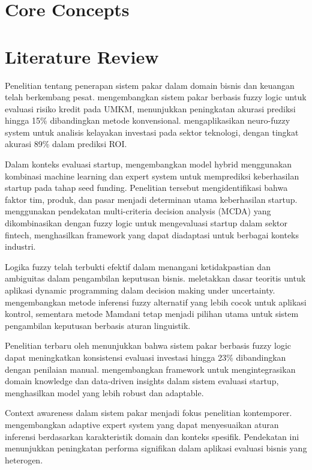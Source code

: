 \documentclass{article}
\begin{document}
\section{Core Concepts}

\section{Literature Review}

Penelitian tentang penerapan sistem pakar dalam domain bisnis dan keuangan telah berkembang pesat. \citet{Kumar2023} mengembangkan sistem pakar berbasis fuzzy logic untuk evaluasi risiko kredit pada UMKM, menunjukkan peningkatan akurasi prediksi hingga 15\% dibandingkan metode konvensional. \citet{Zhang2022} mengaplikasikan neuro-fuzzy system untuk analisis kelayakan investasi pada sektor teknologi, dengan tingkat akurasi 89\% dalam prediksi ROI.

Dalam konteks evaluasi startup, \citet{Silva2023} mengembangkan model hybrid menggunakan kombinasi machine learning dan expert system untuk memprediksi keberhasilan startup pada tahap seed funding. Penelitian tersebut mengidentifikasi bahwa faktor tim, produk, dan pasar menjadi determinan utama keberhasilan startup. \citet{Anderson2022} menggunakan pendekatan multi-criteria decision analysis (MCDA) yang dikombinasikan dengan fuzzy logic untuk mengevaluasi startup dalam sektor fintech, menghasilkan framework yang dapat diadaptasi untuk berbagai konteks industri.

Logika fuzzy telah terbukti efektif dalam menangani ketidakpastian dan ambiguitas dalam pengambilan keputusan bisnis. \citet{Bellman1970} meletakkan dasar teoritis untuk aplikasi dynamic programming dalam decision making under uncertainty. \citet{Sugeno1985} mengembangkan metode inferensi fuzzy alternatif yang lebih cocok untuk aplikasi kontrol, sementara metode Mamdani tetap menjadi pilihan utama untuk sistem pengambilan keputusan berbasis aturan linguistik.

Penelitian terbaru oleh \citet{Wang2023} menunjukkan bahwa sistem pakar berbasis fuzzy logic dapat meningkatkan konsistensi evaluasi investasi hingga 23\% dibandingkan dengan penilaian manual. \citet{Lopez2022} mengembangkan framework untuk mengintegrasikan domain knowledge dan data-driven insights dalam sistem evaluasi startup, menghasilkan model yang lebih robust dan adaptable.

Context awareness dalam sistem pakar menjadi fokus penelitian kontemporer. \citet{Chen2023} mengembangkan adaptive expert system yang dapat menyesuaikan aturan inferensi berdasarkan karakteristik domain dan konteks spesifik. Pendekatan ini menunjukkan peningkatan performa signifikan dalam aplikasi evaluasi bisnis yang heterogen.
\end{document}
